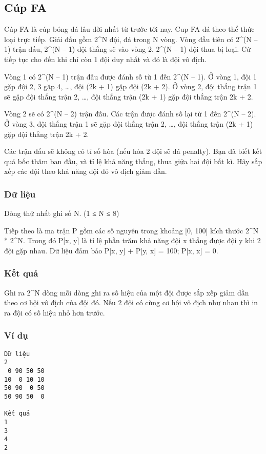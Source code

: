 



\subsection{   Cúp FA  }

   Cúp FA là cúp bóng đá lâu đời nhất từ trước tới nay. Cup FA đá theo thể thức loại trực tiếp. Giải đấu gồm 2^N đội, đá trong N vòng. Vòng đầu tiên có 2^(N – 1) trận đấu, 2^(N – 1) đội thắng sẽ vào vòng 2. 2^(N – 1) đội thua bị loại. Cứ tiếp tục cho đến khi chỉ còn 1 đội duy nhất và đó là đội vô địch.  

   Vòng 1 có 2^(N – 1) trận đấu được đánh số từ 1 đến 2^(N – 1). Ở vòng 1, đội 1 gặp đội 2, 3 gặp 4, …, đội (2k + 1) gặp đội (2k + 2). Ở vòng 2, đội thắng trận 1 sẽ gặp đội thắng trận 2, …, đội thắng trận (2k + 1) gặp đội thắng trận 2k + 2.  

   Vòng 2 sẽ có 2^(N – 2) trận đấu. Các trận được đánh số lại từ 1 đến 2^(N – 2). Ở vòng 3, đội thắng trận 1 sẽ gặp đội thắng trận 2, …, đội thắng trận (2k + 1) gặp đội thắng trận 2k + 2.  

   Các trận đấu sẽ không có tỉ số hòa (nếu hòa 2 đội sẽ đá penalty). Bạn đã biết kết quả bốc thăm ban đầu, và tỉ lệ khả năng thắng, thua giữa hai đội bất kì. Hãy sắp xếp các đội theo khả năng đội đó vô địch giảm dần.  

\subsubsection{   Dữ liệu  }

   Dòng thứ nhất ghi số N. (1 ≤ N ≤ 8)  

   Tiếp theo là ma trận P gồm các số nguyên trong khoảng [0, 100] kích thước 2^N * 2^N. Trong đó P[x, y] là tỉ lệ phần trăm khả năng đội x thắng được đội y khi 2 đội gặp nhau. Dữ liệu đảm bảo P[x, y] + P[y, x] = 100; P[x, x] = 0.  

\subsubsection{   Kết quả  }

   Ghi ra 2^N dòng mỗi dòng ghi ra số hiệu của một đội được sắp xếp giảm dần theo cơ hội vô địch của đội đó. Nếu 2 đội có cùng cơ hội vô địch như nhau thì in ra đội có số hiệu nhỏ hơn trước.  

\subsubsection{   Ví dụ  }
\begin{verbatim}
Dữ liệu
2
 0 90 50 50
10  0 10 10
50 90  0 50
50 90 50  0

Kết quả
1
3
4
2
\end{verbatim}

